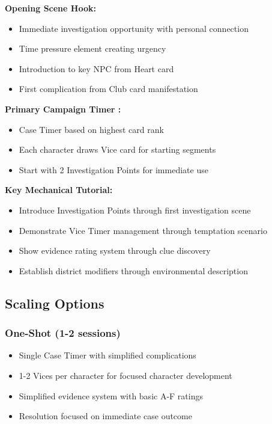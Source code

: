\documentclass[11pt]{article}
\begin{document}
\textbf{Opening Scene Hook:}
\begin{itemize}
\item Immediate investigation opportunity with personal connection
\item Time pressure element creating urgency
\item Introduction to key NPC from Heart card
\item First complication from Club card manifestation
\end{itemize}

\textbf{Primary Campaign Timer :}
\begin{itemize}
\item Case Timer based on highest card rank
\item Each character draws Vice card for starting segments
\item Start with 2 Investigation Points for immediate use
\end{itemize}

\textbf{Key Mechanical Tutorial:}
\begin{itemize}
\item Introduce Investigation Points through first investigation scene
\item Demonstrate Vice Timer management through temptation scenario
\item Show evidence rating system through clue discovery
\item Establish district modifiers through environmental description
\end{itemize}

\subsection{Scaling Options}

\subsubsection{One-Shot (1-2 sessions)}

\begin{itemize}
\item Single Case Timer with simplified complications
\item 1-2 Vices per character for focused character development
\item Simplified evidence system with basic A-F ratings
\item Resolution focused on immediate case outcome
\end{itemize}
\end{document}
